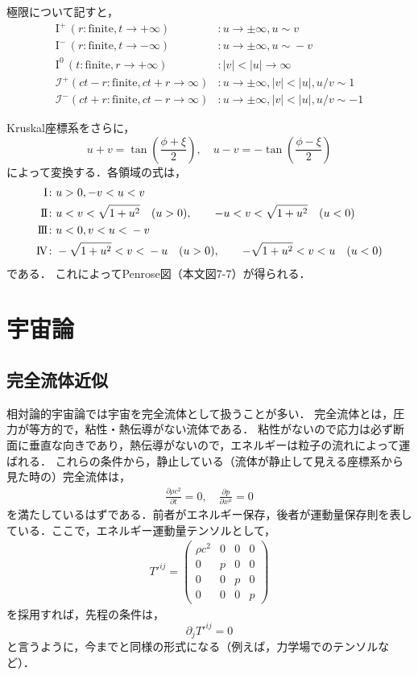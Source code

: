 \documentclass[a4paper]{ltjsreport}
\begin{document}
極限について記すと，
\begin{align*}
  \text{I}^ + \,(r\colon\text{finite},t\to + \infty) &\colon u\to\pm\infty,u\sim{}v\\
  \text{I}^ - \,(r\colon\text{finite},t\to - \infty) &\colon u\to\pm\infty,u\sim{} - v\\
  \text{I}^0\,(t\colon\text{finite},r\to + \infty) &\colon |v|<{}|u|\to\infty\\
  \mathscr{I}^ + (ct - r\colon\text{finite},ct + r\to\infty) &\colon u\to\pm\infty,|v|<{}|u|,u/v\sim1\\
  \mathscr{I}^ - (ct + r\colon\text{finite},ct - r\to\infty) &\colon u\to\pm\infty,|v|<{}|u|,u/v\sim - 1
\end{align*}

Kruskal座標系をさらに，
\[u + v=\tan\left(\frac{\phi + \xi}{2}\right),\quad{}u - v= - \tan\left(\frac{\phi - \xi}{2}\right)\]
によって変換する．各領域の式は，
\begin{align*}
  \text{I} &\colon u>0, - v<{}u<{}v\\
  \text{I}\hspace{-.1em}\text{I} &\colon u<{}v<\sqrt{1 + u^2}\quad(u>0),\qquad - u<{}v<\sqrt{1 + u^2}\quad(u<{}0)\\
  \text{I}\hspace{-.1em}\text{I}\hspace{-.1em}\text{I} &\colon u<{}0,v<{}u<{} - v\\
  \text{I}\hspace{-.1em}\text{V} &\colon  - \sqrt{1 + u^2}<{}v<{} - u\quad(u>0),\qquad - \sqrt{1 + u^2}<{}v<{}u\quad(u<{}0)
\end{align*}
である．
これによってPenrose図（本文図7-7）が得られる．

\chapter{宇宙論}
\section{完全流体近似}
相対論的宇宙論では宇宙を完全流体として扱うことが多い．
完全流体とは，圧力が等方的で，粘性・熱伝導がない流体である．
粘性がないので応力は必ず断面に垂直な向きであり，熱伝導がないので，エネルギーは粒子の流れによって運ばれる．
これらの条件から，静止している（流体が静止して見える座標系から見た時の）完全流体は，
\begin{align}
  \frac{\partial\rho{c^2}}{\partial{t}}=0,\quad\frac{\partial{p}}{\partial{x^{\mu}}}=0
\end{align}
を満たしているはずである．前者がエネルギー保存，後者が運動量保存則を表している．ここで，エネルギー運動量テンソルとして，
\begin{align}
  T'^{ij}=
  \begin{pmatrix}
    \rho{c^2} & 0 & 0 & 0\\
    0 & p & 0 & 0\\
    0 & 0 & p & 0\\
    0 & 0 & 0 & p
  \end{pmatrix}
\end{align}
を採用すれば，先程の条件は，
\[\partial_{j}T'^{ij}=0\]
と言うように，今までと同様の形式になる（例えば，力学場でのテンソルなど）．
\end{document}
